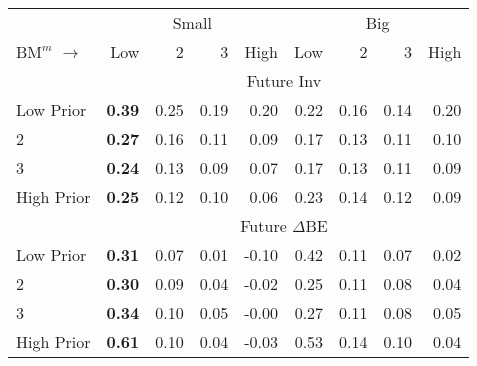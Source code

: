 
\begin{tabular}{lrrrrrrrr}
  \toprule
     & \multicolumn{4}{c}{Small} & \multicolumn{4}{c}{Big}  \\
     \cmidrule(r){2-5} \cmidrule(r){6-9}
    $\text{BM}^m$ $\rightarrow$ & Low & 2 & 3 & High & Low & 2 & 3 & High  \\ 
  \midrule
  
  
    
  
    
  
    & \multicolumn{8}{c}{Future Inv}  \\
     \cmidrule(r){2-5} \cmidrule(r){6-9}
    Low Prior  & \textbf{0.39}  & 0.25  & 0.19  & 0.20  & 0.22  & 0.16  & 0.14  & 0.20   \\
    2  & \textbf{0.27}  & 0.16  & 0.11  & 0.09  & 0.17  & 0.13  & 0.11  & 0.10   \\
    3  & \textbf{0.24}  & 0.13  & 0.09  & 0.07  & 0.17  & 0.13  & 0.11  & 0.09   \\
    High Prior  & \textbf{0.25}  & 0.12  & 0.10  & 0.06  & 0.23  & 0.14  & 0.12  & 0.09   \\
    
  
    & \multicolumn{8}{c}{Future $\Delta\text{BE}$}  \\
     \cmidrule(r){2-5} \cmidrule(r){6-9}
    Low Prior  & \textbf{0.31}  & 0.07  & 0.01  & -0.10  & 0.42  & 0.11  & 0.07  & 0.02   \\
    2  & \textbf{0.30}  & 0.09  & 0.04  & -0.02  & 0.25  & 0.11  & 0.08  & 0.04   \\
    3  & \textbf{0.34}  & 0.10  & 0.05  & -0.00  & 0.27  & 0.11  & 0.08  & 0.05   \\
    High Prior  & \textbf{0.61}  & 0.10  & 0.04  & -0.03  & 0.53  & 0.14  & 0.10  & 0.04   \\
    
  
  \bottomrule
\end{tabular}
